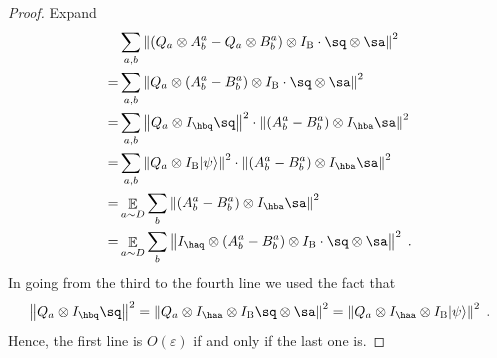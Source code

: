 \documentclass[11pt]{article}
\theoremstyle{definition}
\newcommand{\ket}[1]{|#1\rangle}
\newcommand{\Id}{\ensuremath{I}}
\newcommand{\eps}{\varepsilon}
\newcommand{\norm}[1]{\left\| {#1} \right\|}
\newcommand{\E}{\mathop{\mathbb{E}}\displaylimits}
\newcommand{\labelstyle}[1]{\ensuremath{\textsc{#1}}\xspace}
\newcommand{\bob}{\labelstyle{B}}
\begin{document}
\begin{proof}
 Expand
  \begin{align*}
    & \sum_{a,b} \norm{ (Q_a \otimes A^a_b - Q_a \otimes B^a_b) \otimes
      \Id_{\bob} \cdot \sq \otimes \sa }^2\\
    = & \sum_{a,b} \norm{ Q_a \otimes (A^a_b -  B^a_b) \otimes
        \Id_{\bob} \cdot \sq \otimes \sa}^2\\
    = & \sum_{a, b} \norm{ Q_a \otimes I_{\hbq} \sq}^2 \cdot
        \norm{  (A^a_b -  B^a_b) \otimes \Id_{\hba} \sa }^2\\
	= & \sum_{a, b} \norm{ Q_a \otimes \Id_{\bob} \ket{\psi}}^2 \cdot
      \norm{  (A^a_b -  B^a_b) \otimes \Id_{\hba} \sa }^2\\
    = & \E_{a \sim D} \sum_{b}
        \norm{  (A^a_b -  B^a_b) \otimes \Id_{\hba} \sa }^2\\
    = & \E_{a \sim D} \sum_{b}
      \norm{  \Id_{\haq} \otimes (A^a_b -  B^a_b) \otimes
        \Id_{\bob} \cdot \sq \otimes \sa }^2\;.
  \end{align*}
  In going from the third to the fourth line we used the fact that
  \[
    \norm{ Q_a \otimes I_{\hbq} \sq }^2 =
    \norm{ Q_a \otimes \Id_{\haa} \otimes I_{\bob} \sq \otimes \sa }^2
    = \norm{ Q_a \otimes \Id_{\haa} \otimes \Id_{\bob} \ket{\psi} }^2\;.
  \]
  Hence, the first line is $O(\eps)$ if and only if the last one is.
\end{proof}
\end{document}
